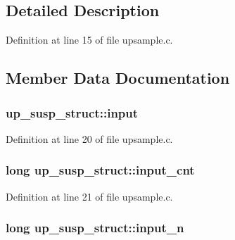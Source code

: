 \subsection{Detailed Description}


Definition at line 15 of file upsample.\+c.



\subsection{Member Data Documentation}
\subsubsection[{\texorpdfstring{input}{input}}]{ up\+\_\+susp\+\_\+struct\+::input}\hypertarget{structup__susp__struct_a4459a17fc4ed97fdca6bec3fb2cab370}{}\label{structup__susp__struct_a4459a17fc4ed97fdca6bec3fb2cab370}


Definition at line 20 of file upsample.\+c.

\subsubsection[{\texorpdfstring{input\+\_\+cnt}{input_cnt}}]{\setlength{\rightskip}{0pt plus 5cm}long up\+\_\+susp\+\_\+struct\+::input\+\_\+cnt}\hypertarget{structup__susp__struct_a419d1c129800f6692fed14746b8260b5}{}\label{structup__susp__struct_a419d1c129800f6692fed14746b8260b5}


Definition at line 21 of file upsample.\+c.

\subsubsection[{\texorpdfstring{input\+\_\+n}{input_n}}]{\setlength{\rightskip}{0pt plus 5cm}long up\+\_\+susp\+\_\+struct\+::input\+\_\+n}\hypertarget{structup__susp__struct_a193d2eb910a39cb1833fe79686d4f583}{}\label{structup__susp__struct_a193d2eb910a39cb1833fe79686d4f583}


